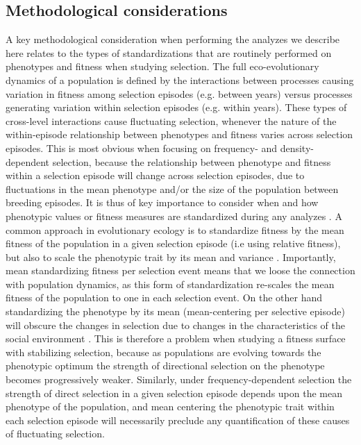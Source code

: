 \documentclass{article}
\begin{document}
\subsection{Methodological considerations}
 A key methodological consideration when performing the analyzes we describe here relates to the types of standardizations that are routinely performed on phenotypes and fitness when studying selection. The full eco-evolutionary dynamics of a population is defined by the interactions between processes causing variation in fitness among selection episodes (e.g. between years) versus processes generating variation within selection episodes (e.g. within years). These types of cross-level interactions cause fluctuating selection, whenever the nature of the within-episode relationship between phenotypes and fitness varies across selection episodes. This is most obvious when focusing on frequency- and density-dependent selection, because the relationship between phenotype and fitness within a selection episode will change across selection episodes, due to fluctuations in the mean phenotype and/or the size of the population between breeding episodes. It is thus of key importance to consider when and how phenotypic values or fitness measures are standardized during any analyzes \citep{DeLisle2017}. A common approach in evolutionary ecology is to standardize fitness by the mean fitness of the population in a given selection episode (i.e using relative fitness), but also to scale the phenotypic trait by its mean and variance \citep{Dingemanse2021}. Importantly, mean standardizing fitness per selection event means that we loose the connection with population dynamics, as this form of standardization re-scales the mean fitness of the population to one in each selection event. On the other hand standardizing the phenotype by its mean (mean-centering per selective episode) will obscure the changes in selection due to changes in the characteristics of the social environment \citep{Araya-Ajoy2020}. This is therefore a problem when studying a fitness surface with stabilizing selection, because as populations are evolving towards the phenotypic optimum the strength of directional selection on the phenotype becomes progressively weaker. Similarly, under frequency-dependent selection the strength of direct selection in a given selection episode depends upon the mean phenotype of the population, and mean centering the phenotypic trait within each selection episode will necessarily preclude any quantification of these causes of fluctuating selection. 
\end{document}
